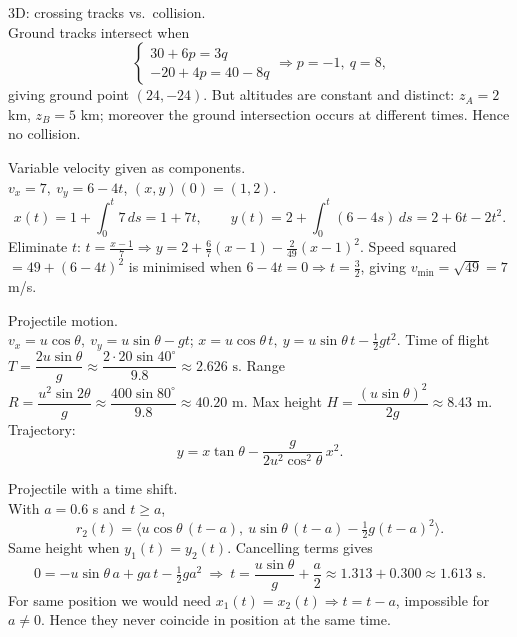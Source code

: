 \documentclass[11pt]{article}
\def\textbf#1{#1}%
\def\mathbf#1{#1}%
\begin{document}
\begin{solution}
\textbf{3D: crossing tracks vs.\ collision.}\\
Ground tracks intersect when
\[
\begin{cases}
30+6p=3q\\
-20+4p=40-8q
\end{cases}
\Rightarrow p=-1,\ q=8,
\]
giving ground point \((24,-24)\).  
But altitudes are constant and distinct: \(z_A=2\) km, \(z_B=5\) km; moreover the ground intersection occurs at different times. Hence no collision.
\end{solution}

\begin{solution}
\textbf{Variable velocity given as components.}\\
\(v_x=7,\ v_y=6-4t\), \((x,y)(0)=(1,2)\).
\[
x(t)=1+\!\int_0^t 7\,ds=1+7t,\qquad
y(t)=2+\!\int_0^t (6-4s)\,ds=2+6t-2t^2.
\]
Eliminate \(t\): \(t=\frac{x-1}{7}\Rightarrow
y=2+\frac{6}{7}(x-1)-\frac{2}{49}(x-1)^2.\)
Speed squared \(=49+(6-4t)^2\) is minimised when \(6-4t=0\Rightarrow t=\tfrac32\), giving
\(v_{\min}=\sqrt{49}=7\) m/s.
\end{solution}

\begin{solution}
\textbf{Projectile motion.}\\
\(v_x=u\cos\theta,\ v_y=u\sin\theta-gt\); 
\(x=u\cos\theta\,t,\ y=u\sin\theta\,t-\tfrac12 gt^2\).  
Time of flight \(T=\dfrac{2u\sin\theta}{g}\approx\dfrac{2\cdot20\sin40^\circ}{9.8}\approx2.626\text{ s}\).  
Range \(R=\dfrac{u^2\sin2\theta}{g}\approx\dfrac{400\sin80^\circ}{9.8}\approx40.20\text{ m}\).  
Max height \(H=\dfrac{(u\sin\theta)^2}{2g}\approx8.43\text{ m}\).  
Trajectory:
\[
y=x\tan\theta-\frac{g}{2u^2\cos^2\theta}\,x^2.
\]
\end{solution}

\begin{solution}
\textbf{Projectile with a time shift.}\\
With \(a=0.6\) s and \(t\ge a\),
\[
\mathbf{r}_2(t)=\bigl\langle u\cos\theta\,(t-a),\ u\sin\theta\,(t-a)-\tfrac12 g(t-a)^2 \bigr\rangle.
\]
Same height when \(y_1(t)=y_2(t)\). Cancelling terms gives
\[
0=-u\sin\theta\,a+ga\,t-\tfrac12 ga^2
\ \Rightarrow\ 
t=\frac{u\sin\theta}{g}+\frac{a}{2}\approx1.313+0.300\approx1.613\text{ s}.
\]
For same position we would need \(x_1(t)=x_2(t)\Rightarrow t=t-a\), impossible for \(a\ne0\).  
Hence they never coincide in position at the same time.
\end{solution}
\end{document}
